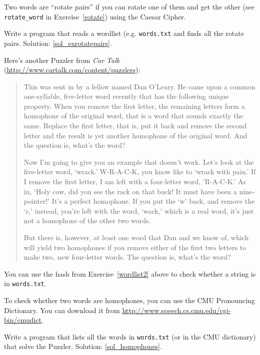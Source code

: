 \begin{exercise}
\label{exrotatepairs}

Two words are ``rotate pairs'' if you can rotate one of them
and get the other (see \verb"rotate_word" in 
Exercise~\ref{rotate}) using the Caesar Cipher.

Write a program that reads a wordlist (e.g. {\tt words.txt} 
and finds all the rotate pairs.  
Solution: \ref{sol_exrotatepairs}.

\end{exercise}


\begin{exercise}
\label{homophones}

Here's another Puzzler from {\em Car Talk} 
(\url{http://www.cartalk.com/content/puzzlers}):

\begin{quote}
This was sent in by a fellow named Dan O'Leary. He came upon a common
one-syllable, five-letter word recently that has the following unique
property. When you remove the first letter, the remaining letters form
a homophone of the original word, that is a word that sounds exactly
the same. Replace the first letter, that is, put it back and remove
the second letter and the result is yet another homophone of the
original word. And the question is, what's the word?

Now I'm going to give you an example that doesn't work. Let's look at
the five-letter word, `wrack.' W-R-A-C-K, you know like to `wrack with
pain.' If I remove the first letter, I am left with a four-letter
word, 'R-A-C-K.' As in, `Holy cow, did you see the rack on that buck!
It must have been a nine-pointer!' It's a perfect homophone. If you
put the `w' back, and remove the `r,' instead, you're left with the
word, `wack,' which is a real word, it's just not a homophone of the
other two words.

But there is, however, at least one word that Dan and we know of,
which will yield two homophones if you remove either of the first two
letters to make two, new four-letter words. The question is, what's
the word?
\end{quote}

You can use the hash from Exercise~\ref{wordlist2} above to check
whether a string is in {\tt words.txt}.

To check whether two words are homophones, you can use the CMU
Pronouncing Dictionary.  You can download it from
\url{http://www.speech.cs.cmu.edu/cgi-bin/cmudict}.

Write a program that lists all the words in {\tt words.txt} 
(or in the CMU dictionary) that solve the Puzzler.
Solution: \ref{sol_homophones}.

\end{exercise}


